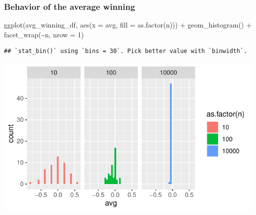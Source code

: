 \documentclass[
  ignorenonframetext,
]{beamer}
\newenvironment{Shaded}{\begin{snugshade}}{\end{snugshade}}
\newcommand{\AttributeTok}[1]{\textcolor[rgb]{0.77,0.63,0.00}{#1}}
\newcommand{\DecValTok}[1]{\textcolor[rgb]{0.00,0.00,0.81}{#1}}
\newcommand{\FunctionTok}[1]{\textcolor[rgb]{0.00,0.00,0.00}{#1}}
\newcommand{\NormalTok}[1]{#1}
\newcommand{\SpecialCharTok}[1]{\textcolor[rgb]{0.00,0.00,0.00}{#1}}
\begin{document}
\begin{frame}[fragile]
\frametitle{Behavior of the average winning}
\tiny

\begin{Shaded}
\begin{Highlighting}[]
\FunctionTok{ggplot}\NormalTok{(avg\_winning\_df, }\FunctionTok{aes}\NormalTok{(}\AttributeTok{x =}\NormalTok{ avg, }\AttributeTok{fill =} \FunctionTok{as.factor}\NormalTok{(n))) }\SpecialCharTok{+} 
  \FunctionTok{geom\_histogram}\NormalTok{() }\SpecialCharTok{+}
  \FunctionTok{facet\_wrap}\NormalTok{(}\SpecialCharTok{\textasciitilde{}}\NormalTok{n, }\AttributeTok{nrow =} \DecValTok{1}\NormalTok{)}
\end{Highlighting}
\end{Shaded}

\begin{verbatim}
## `stat_bin()` using `bins = 30`. Pick better value with `binwidth`.
\end{verbatim}

\begin{center}\includegraphics[width=0.9\linewidth]{Probability_Statistics_101_v2_files/figure-beamer/unnamed-chunk-11-1} \end{center}
\end{frame}
\end{document}
